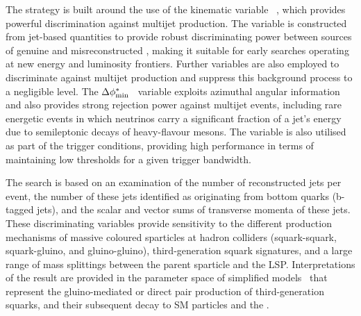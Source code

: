 The strategy is built around the use of the kinematic variable
\alphat~\cite{Randall:2008rw, RA1Paper}, which provides powerful
discrimination against multijet production. The \alphat variable is
constructed from jet-based quantities to provide robust discriminating
power between sources of genuine and misreconstructed \ptvecmiss,
making it suitable for early searches operating at new energy and
luminosity frontiers. Further variables are also employed to
discriminate against multijet production and suppress this background
process to a negligible level. The $\Delta\phi^{*}_{\rm
  min}$~\cite{RA1Paper} variable exploits azimuthal angular
information and also provides strong rejection power against multijet
events, including rare energetic events in which neutrinos carry a
significant fraction of a jet's energy due to semileptonic decays of
heavy-flavour mesons. The \alphat variable is also utilised as part of
the trigger conditions, providing high performance in terms of
maintaining low thresholds for a given trigger bandwidth.


The search is based on an examination of the number of reconstructed
jets per event, the number of these jets identified as originating
from bottom quarks (b-tagged jets), and the scalar and vector sums of
transverse momenta of these jets.  These discriminating variables
provide sensitivity to the different production mechanisms of massive
coloured sparticles at hadron colliders (\ie squark-squark,
squark-gluino, and gluino-gluino), third-generation squark signatures,
and a large range of mass splittings between the parent sparticle and
the LSP. Interpretations of the result are provided in the parameter
space of simplified models~\cite{Alwall:2008ag, Alwall:2008va, sms}
that represent the gluino-mediated or direct pair production of
third-generation squarks, and their subsequent decay to SM particles
and the \chiz.

